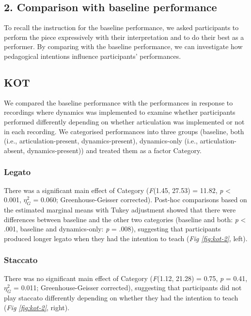 \documentclass[
  man,floatsintext]{apa6}
\begin{document}
\hypertarget{comparison-with-baseline-performance}{%
\subsection{2. Comparison with baseline performance}\label{comparison-with-baseline-performance}}

To recall the instruction for the baseline performance, we asked participants to perform the piece expressively with their interpretation and to do their best as a performer. By comparing with the baseline performance, we can investigate how pedagogical intentions influence participants' performances.

\hypertarget{kot-1}{%
\subsection{KOT}\label{kot-1}}

We compared the baseline performance with the performances in response to recordings where dynamics was implemented to examine whether participants performed differently depending on whether articulation was implemented or not in each recording. We categorised performances into three groups (baseline, both (i.e., articulation-present, dynamics-present), dynamics-only (i.e., articulation-absent, dynamics-present)) and treated them as a factor Category.

\hypertarget{legato-1}{%
\subsubsection{Legato}\label{legato-1}}

There was a significant main effect of Category (\emph{F}(1.45, 27.53) = 11.82, \emph{p} \textless{} 0.001, \(\eta_G^2\) = 0.060; Greenhouse-Geisser corrected). Post-hoc comparisons based on the estimated marginal means with Tukey adjustment showed that there were differences between baseline and the other two categories (baseline and both: \emph{p} \textless{} .001, baseline and dynamics-only: \emph{p} = .008), suggesting that participants produced longer legato when they had the intention to teach (\emph{Fig \ref{fig:kot-2}}, left).

\hypertarget{staccato-1}{%
\subsubsection{Staccato}\label{staccato-1}}

There was no significant main effect of Category (\emph{F}(1.12, 21.28) = 0.75, \emph{p} = 0.41, \(\eta_G^2\) = 0.011; Greenhouse-Geisser corrected), suggesting that participants did not play staccato differently depending on whether they had the intention to teach (\emph{Fig \ref{fig:kot-2}}, right).
\end{document}
